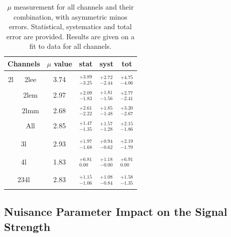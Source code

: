 \begin{table}[htbp]
\begin{center}
\begin{tabular}{|c|c|c|c|c|c|}
\hline
\multicolumn{2}{|c|}{ Channels} &  $\mu$ value &  stat &  syst &  tot \\
\hline 
          &   &  &   &  &    \\
2l     & 2lee   & 3.74 & $^{+3.89}_{-3.25}$ & $^{+2.72}_{-2.44}$ &  $^{+4.75}_{-4.06}$ \\ 
          &   &  &   &  &    \\
        & 2lem  & 2.97 & $^{+2.09}_{-1.83}$ & $^{+1.81}_{-1.56}$ &  $^{+2.77}_{-2.41}$ \\ 
          &   &  &   &  &    \\
        & 2lmm &  2.68 & $^{+2.61}_{-2.22}$ & $^{+1.85}_{-1.48}$ &  $^{+3.20}_{-2.67}$ \\ 
          &   &  &   &  &    \\
        &  All     &2.85 & $^{+1.47}_{-1.35}$ & $^{+1.57}_{-1.28}$ &  $^{+2.15}_{-1.86}$ \\ 
          &   &  &   &  &    \\
\hline 
\cline{1-6} 
\multicolumn{2}{|c|}{  }  &   &   &  & \\
\multicolumn{2}{|c|}{ 3l }  & 2.93 & $^{+1.97}_{-1.68}$ & $^{+0.94}_{-0.62}$ &  $^{+2.19}_{-1.79}$ \\ 
\multicolumn{2}{|c|}{  }  &   &   &  & \\
\hline 
\multicolumn{2}{|c|}{  }  &   &   &  & \\
\multicolumn{2}{|c|}{ 4l }  &1.83 & $^{+6.81}_{0.00}$ & $^{+1.18}_{-0.00}$ &  $^{+6.91}_{0.00}$ \\ 
\multicolumn{2}{|c|}{  }  &   &   &  & \\
\hline 
\multicolumn{2}{|c|}{  }  &   &   &  & \\
\multicolumn{2}{|c|}{ 234l }  & 2.83 & $^{+1.15}_{-1.06}$ & $^{+1.08}_{-0.84}$ &  $^{+1.58}_{-1.35}$ \\ 
\multicolumn{2}{|c|}{  }  &   &   &  & \\
\hline 
\end{tabular} 
\caption{\label{Tab:MeasuredMu}  $\mu$ measurement for all channels and their combination, with asymmetric minos errors. Statistical, systematics and total error are provided. Results are given on a fit to data for all channels.}
\end{center} 
\end{table} 

\subsection{Nuisance Parameter Impact on the Signal Strength}

